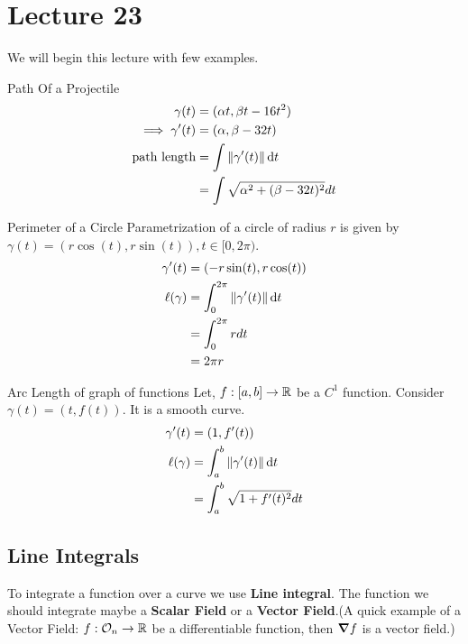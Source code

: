 \documentclass[../Analysis-3.tex]{subfiles}
\begin{document}
\chapter*{Lecture 23} %
\setcounter{chapter}{23} %
\setcounter{section}{0}

We will begin this lecture with few examples.
\begin{Eg}{Path Of a Projectile}{}
  \begin{align*}
    \gamma(t)           & =(\alpha t, \beta t-16t^2)               \\
    \implies \gamma'(t) & = (\alpha, \beta -32t)                   \\
    \text{path length}  & = \int \norm{\gamma'(t)}\dd{t}           \\
                        & = \int \sqrt{\alpha^2 +(\beta-32t)^2} dt
  \end{align*}
\end{Eg}

\begin{Eg}{Perimeter of a Circle}{}
  Parametrization of a circle of radius $r$ is given by $\gamma(t) = (r\cos(t),r\sin(t)), t \in [0,2\pi)$.
  \begin{align*}
    \gamma'(t)    & = (-r\sin(t),r\cos(t))                    \\
    \ell (\gamma) & = \int_{0}^{2\pi} \norm{\gamma'(t)}\dd{t} \\
                  & = \int_{0}^{2\pi} r dt                    \\
                  & = 2\pi r
  \end{align*}
\end{Eg}

\begin{Eg}{Arc Length of graph of functions}{}
  Let, $f : [a,b]\to \mathbb{R}$ be a $C^1$ function. Consider $\gamma(t)=(t, f(t))$. It is a smooth curve.
  \begin{align*}
    \gamma'(t)    & = (1,f'(t))                            \\
    \ell (\gamma) & = \int_{a}^{b} \norm{\gamma'(t)}\dd{t} \\
                  & = \int_{a}^{b} \sqrt{1 + f'(t)^2} dt
  \end{align*}
\end{Eg}

\section{Line Integrals}
To integrate a function over a curve we use \textbf{Line integral}. The function we should integrate maybe a \textbf{Scalar Field} or a \textbf{Vector Field}.(A quick example of a Vector Field: $f : \mathcal{O}_{n} \to \mathbb{R}$ be a differentiable function, then $\grad f$ is a vector field.)
\end{document}
